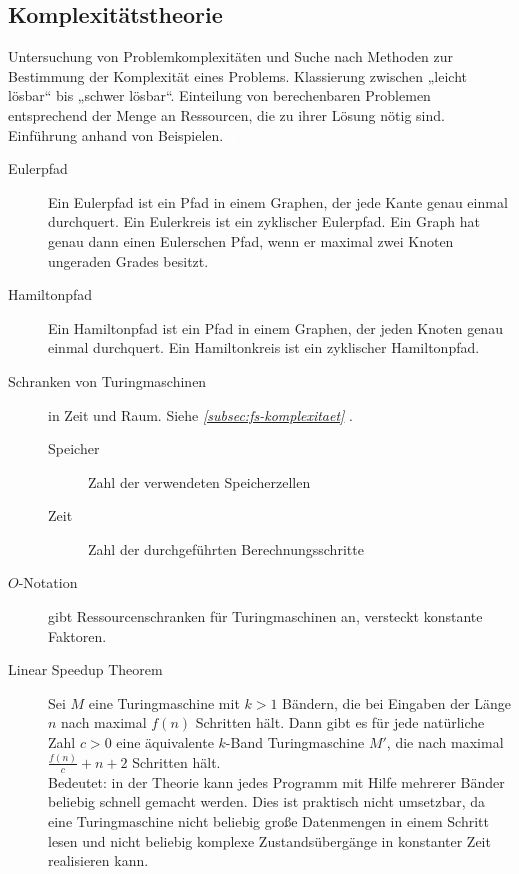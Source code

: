\documentclass[a4paper,10pt]{article}
\newcommand{\vl}[1]{\colorbox{vl}{\textcolor{white}{\small\textbf{#1}}}}
\newcommand{\verweis}[1]{\textit{\ref{#1} \nameref{#1}}}
\begin{document}
    \subsection{Komplexitätstheorie}
    Untersuchung von Problemkomplexitäten und Suche nach Methoden zur Bestimmung der Komplexität eines Problems. Klassierung zwischen „leicht lösbar“ bis „schwer lösbar“. Einteilung von berechenbaren Problemen entsprechend der Menge an Ressourcen, die zu ihrer Lösung nötig sind. Einführung anhand von Beispielen. \vl{TIL 7}
    \begin{description}
        \item[Eulerpfad] Ein Eulerpfad ist ein Pfad in einem Graphen, der jede Kante genau einmal durchquert. Ein Eulerkreis ist ein zyklischer Eulerpfad. Ein Graph hat genau dann einen Eulerschen Pfad, wenn er maximal zwei Knoten ungeraden Grades besitzt.
        \item[Hamiltonpfad] Ein Hamiltonpfad ist ein Pfad in einem Graphen, der jeden Knoten genau einmal durchquert. Ein Hamiltonkreis ist ein zyklischer Hamiltonpfad.

        \item[Schranken von Turingmaschinen] in Zeit und Raum. Siehe \verweis{subsec:fs-komplexitaet}.
            \begin{description}
                \item[Speicher] Zahl der verwendeten Speicherzellen
                \item[Zeit] Zahl der durchgeführten Berechnungsschritte
            \end{description}

        \item[$O$-Notation] gibt Ressourcenschranken für Turingmaschinen an, versteckt konstante Faktoren.
        \item[Linear Speedup Theorem] Sei $M$ eine Turingmaschine mit $k > 1$ Bändern, die bei Eingaben der Länge $n$ nach maximal $f(n)$ Schritten hält. Dann gibt es für jede natürliche Zahl $c > 0$ eine äquivalente $k$-Band Turingmaschine $M'$, die nach maximal $\frac{f(n)}{c} + n + 2$ Schritten hält. \\
        Bedeutet: in der Theorie kann jedes Programm mit Hilfe mehrerer Bänder beliebig schnell gemacht werden. Dies ist praktisch nicht umsetzbar, da eine Turingmaschine nicht beliebig große Datenmengen in einem Schritt lesen und nicht beliebig komplexe Zustandsübergänge in konstanter Zeit realisieren kann.
    \end{description}
\end{document}
